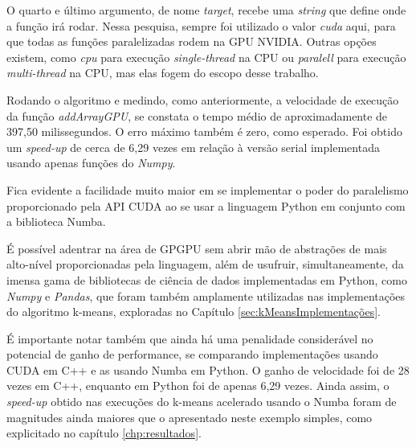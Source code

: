 \documentclass[12pt,
openright, 
oneside, %
a4paper,    %
brazil]{facom-ufu-abntex2}
\begin{document}
O quarto e último argumento, de nome \textit{target}, recebe uma \textit{string} que define onde a função irá rodar. Nessa pesquisa, sempre foi utilizado o valor \textit{cuda} aqui, para que todas as funções paralelizadas rodem na GPU NVIDIA. Outras opções existem, como \textit{cpu} para execução \textit{single-thread} na CPU ou \textit{paralell} para execução \textit{multi-thread} na CPU, mas elas fogem do escopo desse trabalho.

% 

% 
% 
% 
% 

Rodando o algoritmo e medindo, como anteriormente, a velocidade de execução da função \textit{addArrayGPU}, se constata o tempo médio de aproximadamente de 397,50 milissegundos. O erro máximo também é zero, como esperado. Foi obtido um \textit{speed-up} de cerca de 6,29 vezes em relação à versão serial implementada usando apenas funções do \textit{Numpy}.

Fica evidente a facilidade muito maior em se implementar o poder do paralelismo proporcionado pela API CUDA ao se usar a linguagem Python em conjunto com a biblioteca Numba.

É possível adentrar na área de GPGPU sem abrir mão de abstrações de mais alto-nível proporcionadas pela linguagem, além de usufruir, simultaneamente, da imensa gama de bibliotecas de ciência de dados implementadas em Python, como \textit{Numpy} e \textit{Pandas}, que foram também amplamente utilizadas nas implementações do algoritmo k-means, exploradas no Capítulo \ref{sec:kMeansImplementações}.

É importante notar também que ainda há uma penalidade considerável no potencial de ganho de performance, se comparando implementações usando CUDA em C++ e as usando Numba em Python. O ganho de velocidade foi de 28 vezes em C++, enquanto em Python foi de apenas 6,29 vezes. Ainda assim, o \textit{speed-up} obtido nas execuções do k-means acelerado usando o Numba foram de magnitudes ainda maiores que o apresentado neste exemplo simples, como explicitado no capítulo \ref{chp:resultados}.
\end{document}
